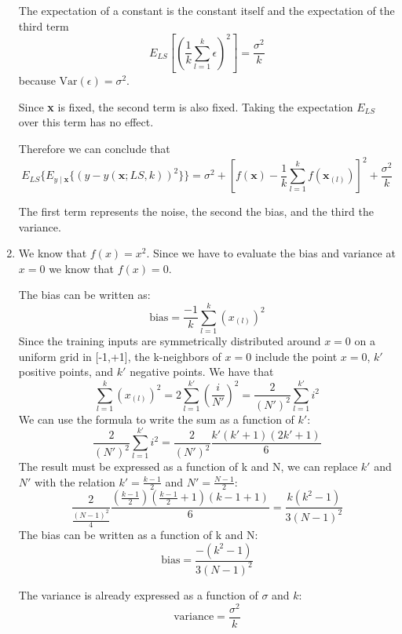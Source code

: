 \documentclass[a4paper,10pt]{article}
\begin{document}
\begin{enumerate}
    The expectation of a constant is the constant itself and the expectation of the third term
    $$
    E_{LS}\left[\left(\frac{1}{k}\sum^k_{l=1}\epsilon\right)^2\right] = \frac{\sigma^2}{k}
    $$
    because $\text{Var}(\epsilon) = \sigma^2$.

    Since \textbf{x} is fixed, the second term is also fixed. Taking the expectation $E_{LS}$ over this term has no effect.

    Therefore we can conclude that
    $$
    E_{LS}\{E_{y\mid \textbf{x}}\{(y - \hat{y}(\textbf{x};LS,k))^2\}\} =
    \sigma^2
    + \left[f(\textbf{x})-\frac{1}{k}\sum^k_{l=1}f(\textbf{x}_{(l)})\right]^2
    + \frac{\sigma^2}{k}
    $$

    The first term represents the noise, the second the bias, and the third the variance. 

    \item 
    We know that $f(x) = x^2$. Since we have to evaluate the bias and variance at $x = 0$ we know that $f(x) = 0$.

    The bias can be written as:
    $$
    \text{bias} = \frac{-1}{k}\sum^k_{l=1}({x}_{(l)})^2
    $$
    Since the training inputs are symmetrically distributed around $x=0$ on a uniform grid in [-1,+1], the k-neighbors of $x=0$ include the point $x=0$, $k'$ positive points, and $k'$ negative points. We have that
    $$
    \sum^k_{l=1}({x}_{(l)})^2 = 2\sum^{k'}_{l=1}\left(\frac{i}{N'}\right)^2 = \frac{2}{(N')^2}\sum^{k'}_{l=1}i^2
    $$
    We can use the formula to write the sum as a function of $k'$:
    $$
    \frac{2}{(N')^2}\sum^{k'}_{l=1}i^2 = \frac{2}{(N')^2}\frac{k'(k'+1)(2k'+1)}{6}
    $$
    The result must be expressed as a function of k and N, we can replace $k'$ and $N'$ with the relation $k' = \frac{k-1}{2}$ and $N' = \frac{N-1}{2}$:
    $$
    \frac{2}{\frac{(N-1)^2}{4}}\frac{(\frac{k-1}{2})(\frac{k-1}{2}+1)(k-1+1)}{6} = \frac{k(k^2 - 1)}{3(N-1)^2}
    $$
    The bias can be written as a function of k and N:
    $$
    \text{bias} = \frac{-(k^2 - 1)}{3(N-1)^2} 
    $$


    The variance is already expressed as a function of $\sigma$ and $k$:
    $$
    \text{variance} = \frac{\sigma^2}{k}
    $$


\end{enumerate}
\end{document}
